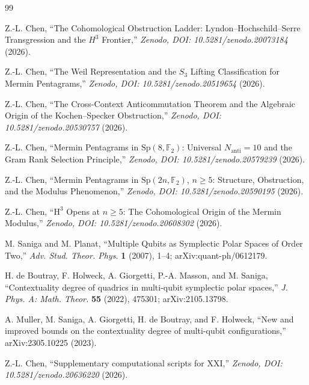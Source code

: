 \documentclass[11pt,a4paper]{article}
\newcommand{\Sp}{\mathrm{Sp}}
\newcommand{\F}{\mathbb{F}}
\theoremstyle{plain}
\theoremstyle{definition}
\theoremstyle{remark}
\begin{document}
\begin{thebibliography}{99}

Z.-L. Chen,
``The Cohomological Obstruction Ladder: 
Lyndon–Hochschild–Serre Transgression and the $H^3$ Frontier,''
\textit{Zenodo, DOI: 10.5281/zenodo.20073184} (2026).

Z.-L. Chen,
``The Weil Representation and the $S_3$ Lifting Classification
for Mermin Pentagrams,''
\textit{Zenodo, DOI: 10.5281/zenodo.20519654} (2026).

Z.-L. Chen,
``The Cross-Context Anticommutation Theorem
and the Algebraic Origin of the Kochen--Specker Obstruction,''
\textit{Zenodo, DOI: 10.5281/zenodo.20530757} (2026).

Z.-L. Chen,
``Mermin Pentagrams in $\Sp(8,\F_2)$:
Universal $N_{\mathrm{anti}}=10$ and the Gram Rank Selection Principle,''
\textit{Zenodo, DOI: 10.5281/zenodo.20579239} (2026).

Z.-L. Chen,
``Mermin Pentagrams in $\Sp(2n,\F_2)$, $n\ge5$:
Structure, Obstruction, and the Modulus Phenomenon,''
\textit{Zenodo, DOI: 10.5281/zenodo.20590195} (2026).

Z.-L. Chen,
``$\mathrm{H}^3$ Opens at $n\ge5$: 
The Cohomological Origin of the Mermin Modulus,''
\textit{Zenodo, DOI: 10.5281/zenodo.20608302} (2026).

M. Saniga and M. Planat,
``Multiple Qubits as Symplectic Polar Spaces of Order Two,''
\textit{Adv. Stud. Theor. Phys.} \textbf{1} (2007), 1--4;
arXiv:quant-ph/0612179.

H. de Boutray, F. Holweck, A. Giorgetti, P.-A. Masson, and M. Saniga,
``Contextuality degree of quadrics in multi-qubit symplectic polar spaces,''
\textit{J. Phys. A: Math. Theor.} \textbf{55} (2022), 475301;
arXiv:2105.13798.

A. Muller, M. Saniga, A. Giorgetti, H. de Boutray, and F. Holweck,
``New and improved bounds on the contextuality degree of multi-qubit configurations,''
arXiv:2305.10225 (2023).

Z.-L. Chen,
``Supplementary computational scripts for XXI,''
\textit{Zenodo, DOI: 10.5281/zenodo.20636220} (2026).

\end{thebibliography}
\end{document}

